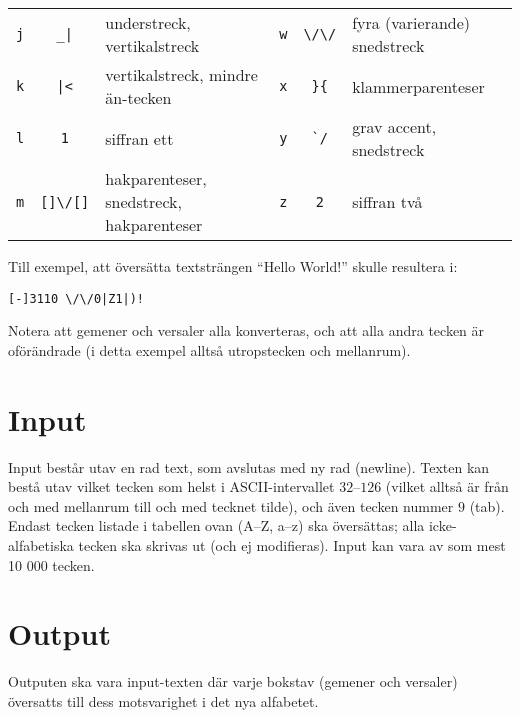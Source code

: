 \begin{center}
\begin{tabular}{|c|c|l||c|c|l|}
        \verb+j+ & \verb+_|+        & understreck, vertikalstreck                           &  \verb+w+ & \verb+\/\/+      & fyra (varierande) snedstreck \\
        \verb+k+ & \verb+|<+        & vertikalstreck, mindre än-tecken &  \verb+x+ & \verb+}{+        & klammerparenteser \\
        \verb+l+ & \verb+1+         & siffran ett &  \verb+y+ & \verb+`/+        & grav accent, snedstreck\\
        \verb+m+ & \verb+[]\/[]+    & hakparenteser, snedstreck, hakparenteser               &  \verb+z+ & \verb+2+         & siffran två\\
        \hline
    \end{tabular}
\end{center}
Till exempel, att översätta textsträngen ``Hello World!'' skulle resultera i:
\begin{center}
\verb+[-]3110 \/\/0|Z1|)!+
\end{center}
Notera att gemener och versaler alla konverteras, och att alla andra tecken är oförändrade (i detta exempel alltså utropstecken och mellanrum).

\section*{Input}
Input består utav en rad text, som avslutas med ny rad (newline).
Texten kan bestå utav vilket tecken som helst i ASCII-intervallet $32$--$126$ (vilket alltså är från och med mellanrum till och med tecknet tilde), och även tecken nummer $9$ (tab).
Endast tecken listade i tabellen ovan (A--Z, a--z) ska översättas; alla icke-alfabetiska tecken ska skrivas ut (och ej modifieras).
Input kan vara av som mest 10 000 tecken.
\section*{Output}
Outputen ska vara input-texten där varje bokstav (gemener och versaler) översatts till dess motsvarighet i det nya alfabetet.
